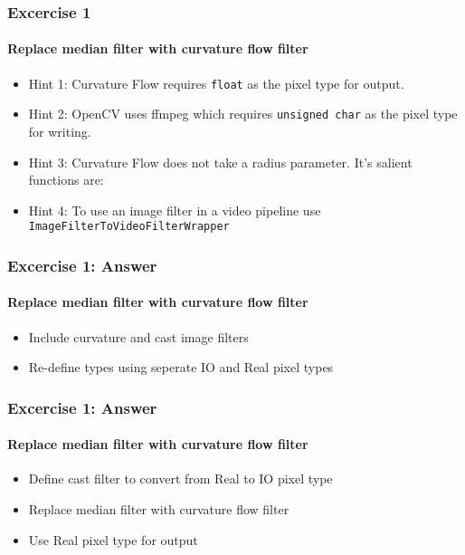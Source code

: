 {
\begin{frame}[fragile]
\frametitle{Excercise 1}
\framesubtitle{Replace median filter with curvature flow filter}
\begin{itemize}
\item Hint 1: Curvature Flow requires {\tt float} as the pixel
  type for output.
\pause

\item Hint 2: OpenCV uses ffmpeg which requires {\tt unsigned char}
  as the pixel type for writing.
\pause

\item Hint 3: Curvature Flow does not take a radius parameter. It's
  salient functions are:
\pause

\item Hint 4: To use an image filter in a video pipeline use
  {\tt ImageFilterToVideoFilterWrapper}
\end{itemize}
\end{frame}
}

{
\begin{frame}[fragile]
\frametitle{Excercise 1: Answer}
\framesubtitle{Replace median filter with curvature flow filter}
\begin{itemize}
\item Include curvature and cast image filters
\pause

\item Re-define types using seperate IO and Real pixel types
\end{itemize}
\end{frame}
}

{
\begin{frame}[fragile]
\frametitle{Excercise 1: Answer}
\framesubtitle{Replace median filter with curvature flow filter}
\begin{itemize}
\item Define cast filter to convert from Real to IO pixel type
\pause

\item Replace median filter with curvature flow filter
\item Use Real pixel type for output
\end{itemize}
\end{frame}
}

